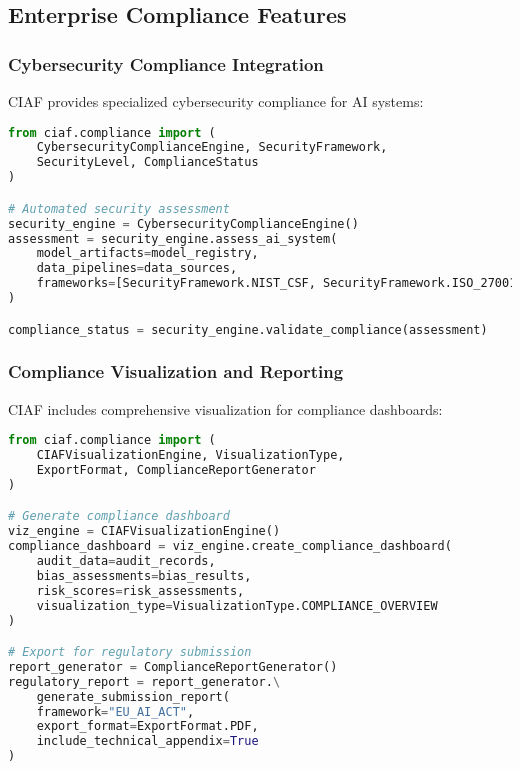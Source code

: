 \documentclass[12pt,a4paper]{article}
\begin{document}
\subsection{Enterprise Compliance Features}

\subsubsection{Cybersecurity Compliance Integration}

CIAF provides specialized cybersecurity compliance for AI systems:

\begin{lstlisting}[language=Python, caption=Cybersecurity Compliance]
from ciaf.compliance import (
    CybersecurityComplianceEngine, SecurityFramework,
    SecurityLevel, ComplianceStatus
)

# Automated security assessment
security_engine = CybersecurityComplianceEngine()
assessment = security_engine.assess_ai_system(
    model_artifacts=model_registry,
    data_pipelines=data_sources,
    frameworks=[SecurityFramework.NIST_CSF, SecurityFramework.ISO_27001]
)

compliance_status = security_engine.validate_compliance(assessment)
\end{lstlisting}

\subsubsection{Compliance Visualization and Reporting}

CIAF includes comprehensive visualization for compliance dashboards:

\begin{lstlisting}[language=Python, caption=Compliance Visualization]
from ciaf.compliance import (
    CIAFVisualizationEngine, VisualizationType,
    ExportFormat, ComplianceReportGenerator
)

# Generate compliance dashboard
viz_engine = CIAFVisualizationEngine()
compliance_dashboard = viz_engine.create_compliance_dashboard(
    audit_data=audit_records,
    bias_assessments=bias_results,
    risk_scores=risk_assessments,
    visualization_type=VisualizationType.COMPLIANCE_OVERVIEW
)

# Export for regulatory submission
report_generator = ComplianceReportGenerator()
regulatory_report = report_generator.\
    generate_submission_report(
    framework="EU_AI_ACT",
    export_format=ExportFormat.PDF,
    include_technical_appendix=True
)
\end{lstlisting}
\end{document}
